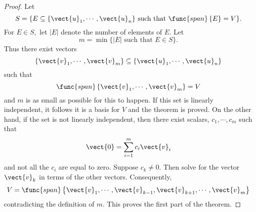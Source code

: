 \begin{proof}Let 
\begin{equation*}
S=\{E\subseteq \{\vect{u}_{1},\cdots ,\vect{u}_{n}\}\text{ such that }%
\func{span}\left\{ E\right\} =V\}.
\end{equation*}
For $E\in S,$ let $\left\vert E\right\vert $ denote the number of elements
of $E.$ Let 
\begin{equation*}
m= \min \{\left\vert E\right\vert \text{ such that }E\in S\}.
\end{equation*}
Thus there exist vectors 
\begin{equation*}
\{\vect{v}_{1},\cdots ,\vect{v}_{m}\}\subseteq \{\vect{u}_{1},\cdots ,%
\vect{u}_{n}\}
\end{equation*}
such that 
\begin{equation*}
\func{span}\left\{ \vect{v}_{1},\cdots ,\vect{v}_{m}\right\} =V
\end{equation*}
and $m$ is as small as possible for this to happen. If this set is linearly
independent, it follows it is a basis for $V$ and the theorem is proved. On
the other hand, if the set is not linearly independent, then there exist
scalars, $c_{1},\cdots ,c_{m}$ such that 
\begin{equation*}
\vect{0}=\sum_{i=1}^{m}c_{i}\vect{v}_{i}
\end{equation*}
and not all the $c_{i}$ are equal to zero. Suppose $c_{k}\neq 0.$ Then solve for the
vector $\vect{v}_{k}$ in terms of the other vectors.
Consequently, 
\begin{equation*}
V=\func{span}\left\{ \vect{v}_{1},\cdots ,\vect{v}_{k-1},\vect{v}
_{k+1},\cdots ,\vect{v}_{m}\right\}
\end{equation*}
contradicting the definition of $m$. This proves the first part of the
theorem.


\end{proof}
